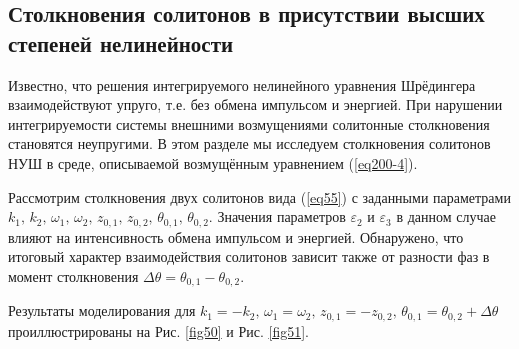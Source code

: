 \documentclass[14pt,a4paper]{extreport}
\begin{document}
		\subsection{Столкновения солитонов в присутствии высших степеней нелинейности}\label{ch350}
			Известно, что решения интегрируемого нелинейного уравнения Шрёдингера взаимодействуют упруго, т.е. без обмена импульсом и энергией. При нарушении интегрируемости системы внешними возмущениями солитонные столкновения становятся неупругими. В этом разделе мы исследуем столкновения солитонов НУШ в среде, описываемой возмущённым уравнением (\ref{eq200-4}).

			Рассмотрим столкновения двух солитонов вида (\ref{eq55}) с заданными параметрами \(k_{1},\,k_{2},\,\omega_{1},\,\omega_{2},\,z_{0,1},\,z_{0,2},\,\theta_{0,1},\,\theta_{0,2}\). Значения параметров \(\varepsilon_{2}\) и \(\varepsilon_{3}\) в данном случае влияют на интенсивность обмена импульсом и энергией. Обнаружено, что итоговый характер взаимодействия солитонов зависит также от разности фаз в момент столкновения \(\Delta \theta=\theta_{0,1}-\theta_{0,2}\).
		
			Результаты моделирования для \(k_{1}=-k_{2},\,\omega_{1}=\omega_{2},\,z_{0,1}=-z_{0,2},\,\theta_{0,1}=\theta_{0,2}+\Delta \theta\) проиллюстрированы на Рис. \ref{fig50} и Рис. \ref{fig51}.
\end{document}

